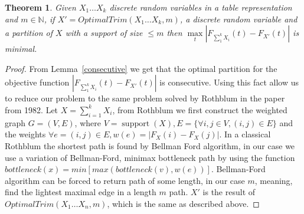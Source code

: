 \documentclass[review]{elsarticle}
\newtheorem{theorem}{Theorem}
\DeclareMathOperator{\support}{support}
\begin{document}

\begin{theorem}
Given $X_1 \dots X_k$ discrete random variables in a table representation and $m \in \mathbb{N}$, if $X'=OptimalTrim(X_1 \dots X_k,m)$, a discrete random variable and a partition of $X$ with a support of size $\leq m$ then $\max\limits_{t}|F_{\sum_1^k X_i}(t)-F_{X'}(t)|$ is minimal.
\end{theorem}

\begin{proof}
From Lemma~\ref{consecutive} we get that the optimal partition for the objective function $|F_{\sum_1^k X_i}(t)-F_{X'}(t)|$ is consecutive.
Using this fact allow us to reduce our problem to the same problem solved by Rothblum in the paper from 1982. Let $X = \sum_{i=1}^k X_i$, from Rothblum we first construct the weighted graph $G = (V,E)$, where $V = \support(X), E = \{\forall i,j \in V, (i,j)\in E\}$ and the weights $\forall e=(i,j)\in E, w(e) = |F_{X}(i)-F_{X}(j)|$. In a classical Rothblum the shortest path is found by Bellman Ford algorithm, in our case we use a variation of Bellman-Ford, minimax bottleneck path by using the function $bottleneck(x) =    min   [max(bottleneck(v),w(e))]$. Bellman-Ford algorithm can be forced to return path of some length, in our case $m$, meaning, find the lightest maximal edge in a length $m$ path. 
$X'$ is the result of $OptimalTrim(X_1 \dots X_n,m)$, which is the same as described above. 
\end{proof}
\end{document}
